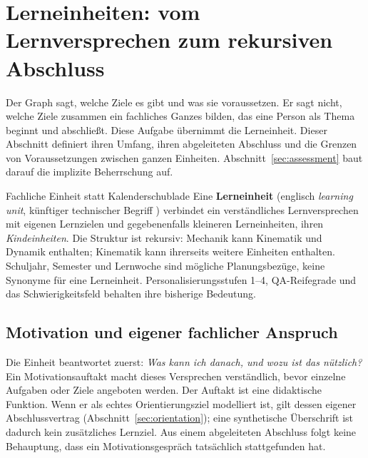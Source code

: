 \section{Lerneinheiten: vom Lernversprechen zum rekursiven Abschluss}
\label{sec:learning-units}
Der Graph sagt, welche Ziele es gibt und was sie voraussetzen. Er sagt
nicht, welche Ziele zusammen ein fachliches Ganzes bilden, das eine Person
als Thema beginnt und abschließt. Diese Aufgabe übernimmt die Lerneinheit.
Dieser Abschnitt definiert ihren Umfang, ihren abgeleiteten Abschluss und
die Grenzen von Voraussetzungen zwischen ganzen Einheiten.
Abschnitt~\ref{sec:assessment} baut darauf die implizite Beherrschung auf.

\begin{principle}{Fachliche Einheit statt Kalenderschublade}
Eine \textbf{Lerneinheit} (englisch \emph{learning unit}, künftiger
technischer Begriff ) verbindet ein verständliches
Lernversprechen mit eigenen Lernzielen und gegebenenfalls kleineren
Lerneinheiten, ihren \emph{Kindeinheiten}. Die Struktur ist rekursiv:
Mechanik kann Kinematik und Dynamik enthalten; Kinematik kann ihrerseits
weitere Einheiten enthalten.
Schuljahr, Semester und Lernwoche sind mögliche Planungsbezüge, keine
Synonyme für eine Lerneinheit. Personalisierungsstufen 1--4, QA-Reifegrade
und das Schwierigkeitsfeld  behalten ihre bisherige Bedeutung.
\end{principle}

\subsection{Motivation und eigener fachlicher Anspruch}
\label{sec:unit-claims}
Die Einheit beantwortet zuerst: \emph{Was kann ich danach, und wozu ist
das nützlich?} Ein Motivationsauftakt macht dieses Versprechen verständlich,
bevor einzelne Aufgaben oder Ziele angeboten werden. Der Auftakt ist eine
didaktische Funktion. Wenn er als echtes Orientierungsziel modelliert ist,
gilt dessen eigener Abschlussvertrag (Abschnitt~\ref{sec:orientation}); eine
synthetische Überschrift ist dadurch kein zusätzliches Lernziel. Aus einem
abgeleiteten Abschluss folgt keine Behauptung, dass ein Motivationsgespräch
tatsächlich stattgefunden hat.

